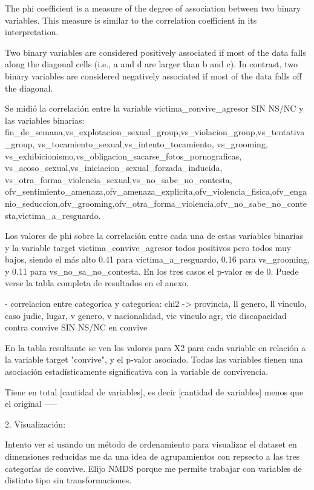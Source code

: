 \documentclass[10pt, spanish]{article}
\begin{document}
The phi coefficient is a measure of the degree of association between two binary variables. This measure is similar to the correlation coefficient in its interpretation.

Two binary variables are considered positively associated if most of the data falls along the diagonal cells (i.e., a and d are larger than b and c). In contrast, two binary variables are considered negatively associated if most of the data falls off the diagonal.

Se midió la correlación entre la variable victima_convive_agresor SIN NS/NC y las variables binarias: fin_de_semana,vs_explotacion_sexual_group,vs_violacion_group,vs_tentativa_group, vs_tocamiento_sexual,vs_intento_tocamiento, vs_grooming, vs_exhibicionismo,vs_obligacion_sacarse_fotos_pornograficas, vs_acoso_sexual,vs_iniciacion_sexual_forzada_inducida, vs_otra_forma_violencia_sexual,vs_no_sabe_no_contesta, ofv_sentimiento_amenaza,ofv_amenaza_explicita,ofv_violencia_fisica,ofv_enganio_seduccion,ofv_grooming,ofv_otra_forma_violencia,ofv_no_sabe_no_contesta,victima_a_resguardo. 

Los valores de phi sobre la correlación entre cada una de estas variables binarias y la variable target victima_convive_agresor todos positivos pero todos muy bajos, siendo el más alto 0.41 para victima_a_resguardo, 0.16 para vs_grooming, y 0.11 para vs_no_sa_no_contesta. En los tres casos el p-valor es de 0. Puede verse la tabla completa de resultados en el anexo.

- correlacion entre categorica y categorica: chi2 -> provincia, ll genero, ll vinculo, caso judic, lugar, v genero, v nacionalidad, vic vinculo agr, vic discapacidad contra convive
SIN NS/NC en convive

En la tabla resultante se ven los valores para X2 para cada variable en relación a la variable target "convive", y el p-valor asociado. Todas las variables tienen una asociación estadísticamente significativa con la variable de convivencia.
 
Tiene en total [cantidad de variables], es decir [cantidad de  variables] menos que el original 
-----

2. Visualización:

Intento ver si usando un método de ordenamiento para visualizar el dataset en dimensiones reducidas me da una
idea de agrupamientos con repsecto a las tres categorías de convive. Elijo NMDS porque me permite trabajar con
variables de distinto tipo sin transformaciones.
\end{document}
